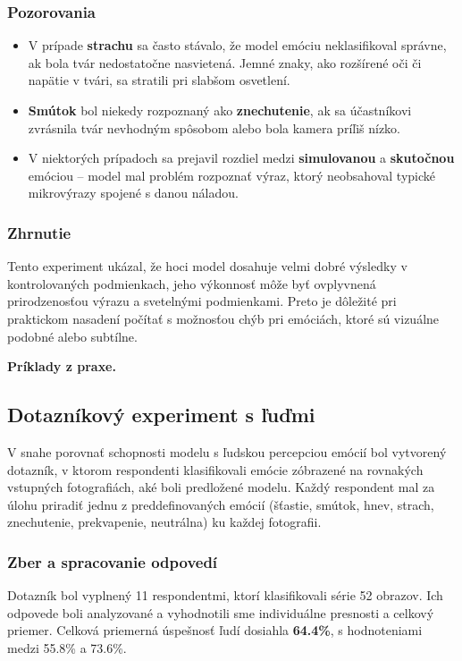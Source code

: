 \subsubsection{Pozorovania}
\begin{itemize}
    \item V pr\'ipade \textbf{strachu} sa \v{c}asto st\'avalo, \v{z}e model em\'ociu neklasifikoval spr\'avne, ak bola tv\'ar nedostato\v{c}ne nasvieten\'a. Jemn\'e znaky, ako roz\v{s}\'iren\'e o\v{c}i \v{c}i nap\"atie v tv\'ari, sa stratili pri slab\v{s}om osvetlen\'i.
    \item \textbf{Sm\'utok} bol niekedy rozpoznan\'y ako \textbf{znechutenie}, ak sa \'u\v{c}astn\'ikovi zvr\'asnila tv\'ar nevhodn\'ym sp\^osobom alebo bola kamera pr\'i\v{l}i\v{s} n\'izko.
    \item V niektor\'ych pr\'ipadoch sa prejavil rozdiel medzi \textbf{simulovanou} a \textbf{skuto\v{c}nou} em\'ociou -- model mal probl\'em rozpozna\v{t}  v\'yraz, ktor\'y neobsahoval typick\'e mikrov\'yrazy spojen\'e s danou n\'aladou.
\end{itemize}

\subsubsection{Zhrnutie}
Tento experiment uk\'azal, \v{z}e hoci model dosahuje velmi dobr\'e v\'ysledky v kontrolovan\'ych podmienkach, jeho v\'ykonnos\v{t} m\^o\v{z}e by\v{t} ovplyvnen\'a prirodzenos\v{t}ou v\'yrazu a sveteln\'ymi podmienkami. Preto je d\^ole\v{z}it\'e pri praktickom nasaden\'i po\v{c}\'ita\v{t} s mo\v{z}nos\v{t}ou ch\'yb pri em\'oci\'ach, ktor\'e s\'u vizu\'alne podobn\'e alebo subt\'ilne.

\textbf{Príklady z praxe.}

\subsection{Dotazn\'ikov\'y experiment s \v{l}u\v{d}mi}

V snahe porovna\v{t} schopnosti modelu s \v{l}udskou percepciou em\'oci\'i bol vytvoren\'y dotazn\'ik, v ktorom respondenti klasifikovali em\'ocie z\'obrazen\'e na rovnak\'ych vstupn\'ych fotografi\'ach, ak\'e boli predlo\v{z}en\'e modelu. Ka\v{z}d\'y respondent mal za \'ulohu priradi\v{t} jednu z preddefinovan\'ych em\'oci\'i (\v{s}\v{t}astie, sm\'utok, hnev, strach, znechutenie, prekvapenie, neutr\'alna) ku ka\v{z}dej fotografii.

\subsubsection{Zber a spracovanie odpoved\'i}
Dotazn\'ik bol vyplnen\'y 11 respondentmi, ktor\'i klasifikovali s\'erie 52 obrazov. Ich odpovede boli analyzovan\'e a vyhodnotili sme individu\'alne presnosti a celkov\'y priemer. Celkov\'a priemern\'a \'uspe\v{s}nos\v{t} \v{l}ud\'i dosiahla \textbf{64.4\%}, s hodnoteniami medzi 55.8\% a 73.6\%.

